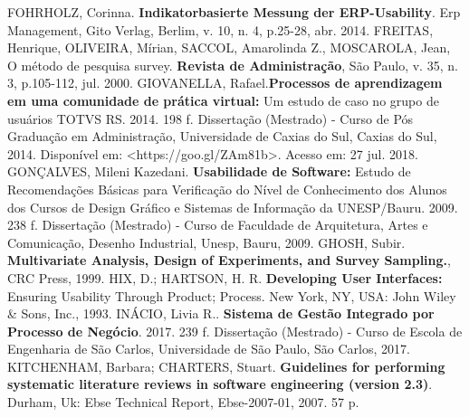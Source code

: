 \newline
\newline
\noindent
FOHRHOLZ, Corinna. \textbf{Indikatorbasierte Messung der ERP-Usability}. Erp Management, Gito Verlag, Berlim, v. 10, n. 4, p.25-28, abr. 2014.
\newline
\newline
\noindent
FREITAS, Henrique, OLIVEIRA, Mírian, SACCOL, Amarolinda Z., MOSCAROLA, Jean,  O método de pesquisa survey. \textbf{Revista de Administração}, São Paulo, v. 35, n. 3, p.105-112, jul. 2000.
\newline
\newline
\noindent
GIOVANELLA, Rafael.\textbf{Processos de aprendizagem em uma comunidade de prática virtual:} Um estudo de caso no grupo de usuários TOTVS RS. 2014. 198 f. Dissertação (Mestrado) - Curso de Pós Graduação em Administração, Universidade de Caxias do Sul, Caxias do Sul, 2014. Disponível em: <https://goo.gl/ZAm81b>. Acesso em: 27 jul. 2018.
\newline
\newline
\noindent
GONÇALVES, Mileni Kazedani. \textbf{Usabilidade de Software:} Estudo de Recomendações Básicas para Verificação do Nível de Conhecimento dos Alunos dos Cursos de Design Gráfico e Sistemas de Informação da UNESP/Bauru. 2009. 238 f. Dissertação (Mestrado) - Curso de Faculdade de Arquitetura, Artes e Comunicação, Desenho Industrial, Unesp, Bauru, 2009.
\newline
\newline
\noindent
GHOSH, Subir. \textbf{Multivariate Analysis, Design of Experiments, and Survey Sampling.}, CRC Press, 1999.
\newline
\newline
\noindent
HIX, D.; HARTSON, H. R. \textbf{Developing User Interfaces:} Ensuring Usability Through Product; Process. New York, NY, USA: John Wiley \& Sons, Inc., 1993. 
\newline
\newline
\noindent
INÁCIO, Livia R.. \textbf{Sistema de Gestão Integrado por Processo de Negócio}. 2017. 239 f. Dissertação (Mestrado) - Curso de Escola de Engenharia de São Carlos, Universidade de São Paulo, São Carlos, 2017.
\newline
\newline
\noindent
KITCHENHAM, Barbara; CHARTERS, Stuart. \textbf{Guidelines for performing systematic literature reviews in software engineering (version 2.3)}. Durham, Uk: Ebse Technical Report, Ebse-2007-01, 2007. 57 p.
\newline
